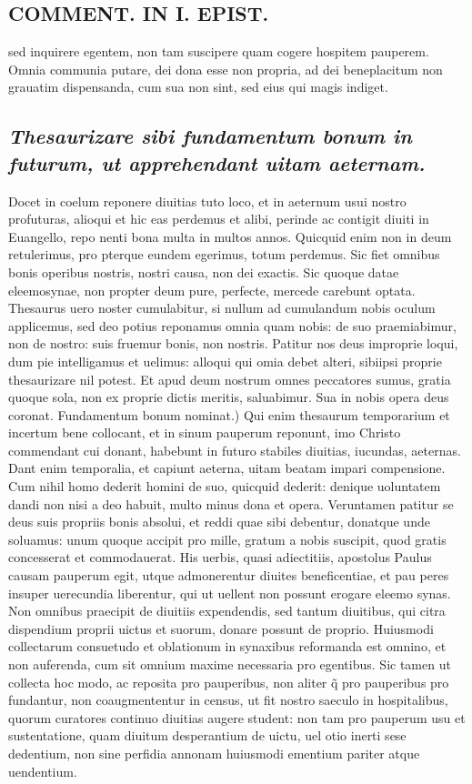 \documentclass{article}
\begin{document}
\begin{pages}
\section*{COMMENT. IN I. EPIST. }
\marginpar{[ p.542 ]}\pstart sed inquirere egentem, non tam suscipere quam cogere hospitem pauperem. Omnia communia putare, dei dona esse non propria, ad dei beneplacitum non grauatim dispensanda, cum sua non sint, sed eius qui magis indiget.  \pend
{}
{}
\subsection*{\textit{Thesaurizare sibi fundamentum bonum in futurum, ut apprehendant uitam aeternam. }}\pstart Docet in coelum reponere diuitias tuto loco, et in aeternum usui nostro profuturas, alioqui et hic eas perdemus et alibi, perinde ac contigit diuiti in Euangello, repo nenti bona multa in multos annos. Quicquid enim non in deum retulerimus, pro pterque eundem egerimus, totum perdemus. Sic fiet omnibus bonis operibus nostris, nostri causa, non dei exactis. Sic quoque datae eleemosynae, non propter deum pure, perfecte, mercede carebunt optata. Thesaurus uero noster cumulabitur, si nullum ad cumulandum nobis oculum applicemus, sed deo potius reponamus omnia quam nobis: de suo praemiabimur, non de nostro: suis fruemur bonis, non nostris. Patitur nos deus improprie loqui, dum pie intelligamus et uelimus: alloqui qui omia debet alteri, sibiipsi proprie thesaurizare nil potest. Et apud deum nostrum omnes peccatores sumus, gratia quoque sola, non ex proprie dictis meritis, saluabimur. Sua in nobis opera deus coronat. Fundamentum bonum nominat.) Qui enim thesaurum temporarium et incertum bene collocant, et in sinum pauperum reponunt, imo Christo commendant cui donant, habebunt in futuro stabiles diuitias, iucundas, aeternas. Dant enim temporalia, et capiunt aeterna, uitam beatam impari compensione. Cum nihil homo dederit homini de suo, quicquid dederit: denique uoluntatem dandi non nisi a deo habuit, multo minus dona et opera. Veruntamen patitur se deus suis propriis bonis absolui, et reddi quae sibi debentur, donatque unde soluamus: unum quoque accipit pro mille, gratum a nobis suscipit, quod gratis concesserat et commodauerat. His uerbis, quasi adiectitiis, apostolus Paulus causam pauperum egit, utque admonerentur diuites beneficentiae, et pau peres insuper uerecundia liberentur, qui ut uellent non possunt erogare eleemo synas. Non omnibus praecipit de diuitiis expendendis, sed tantum diuitibus, qui citra dispendium proprii uictus et suorum, donare possunt de proprio. Huiusmodi collectarum consuetudo et oblationum in synaxibus reformanda est omnino, et non auferenda, cum sit omnium maxime necessaria pro egentibus. Sic tamen ut collecta hoc modo, ac reposita pro pauperibus, non aliter q̃ pro pauperibus pro fundantur, non coaugmententur in census, ut fit nostro saeculo in hospitalibus, quorum curatores continuo diuitias augere student: non tam pro pauperum usu et sustentatione, quam diuitum desperantium de uictu, uel otio inerti sese dedentium, non sine perfidia annonam huiusmodi ementium pariter atque uendentium.  \pend

\end{pages}
\end{document}
